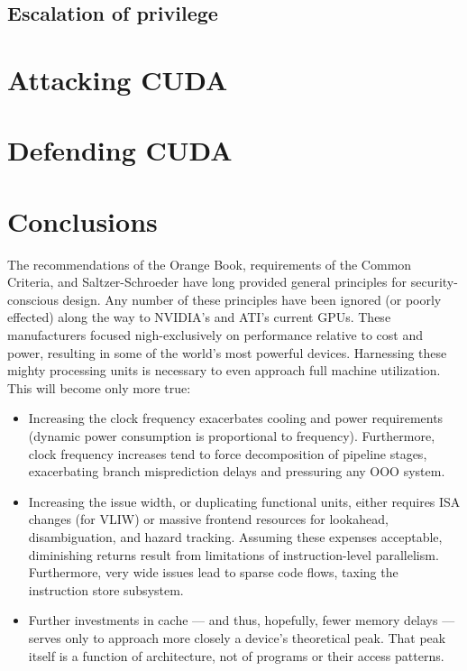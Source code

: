 \documentclass[letterpaper,10pt]{article}
\begin{document}
\begin{multicols}{2}
\subsection{Escalation of privilege}

\section{Attacking CUDA}

\section{Defending CUDA}

\section{Conclusions} 
The recommendations of the Orange Book\cite{orangebook}, requirements of the Common Criteria\cite{ccrit},
and Saltzer-Schroeder\cite{principles} have long provided general principles for
security-conscious design. Any number of these principles have been ignored
(or poorly effected) along the way to NVIDIA's and ATI's current GPUs. These
manufacturers focused nigh-exclusively on performance relative to cost and
power, resulting in some of the world's most powerful devices. Harnessing these
mighty processing units is necessary to even approach full machine utilization.
This will become only more true:
\begin{itemize}
\item Increasing the clock frequency exacerbates cooling and power requirements
(dynamic power consumption is proportional to frequency). Furthermore,
clock frequency increases tend to force decomposition of pipeline
stages, exacerbating branch misprediction delays and pressuring any OOO
system\cite{cormean}.
\item Increasing the issue width, or duplicating functional units, either
requires ISA changes (for VLIW) or massive frontend resources for lookahead,
disambiguation, and hazard tracking. Assuming these expenses acceptable,
diminishing returns result from limitations of instruction-level parallelism.
Furthermore, very wide issues lead to sparse code flows, taxing the instruction
store subsystem. 
\item Further investments in cache --- and thus, hopefully, fewer memory
delays --- serves only to approach more closely a device's theoretical peak.
That peak itself is a function of architecture, not of programs or their
access patterns.

\end{itemize}
\end{multicols}
\end{document}
